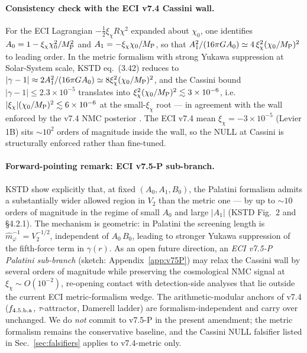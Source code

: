 \paragraph{Consistency check with the ECI v7.4 Cassini wall.}
For the ECI Lagrangian $-\tfrac{1}{2}\xi_\chi R\chi^2$ expanded
about $\chi_0$, one identifies $A_0 = 1 - \xi_\chi\chi_0^2/M_{\rm P}^2$
and $A_1 = -\xi_\chi\chi_0/M_{\rm P}$, so that
$A_1^2/(16\pi G A_0) \simeq 4\,\xi_\chi^2(\chi_0/M_{\rm P})^2$
to leading order.  In the metric formalism with strong Yukawa
suppression at Solar-System scale, KSTD eq.~(3.42) reduces to
$|\gamma-1| \approx 2A_1^2/(16\pi G A_0) \simeq 8\xi_\chi^2(\chi_0/M_{\rm P})^2$,
and the Cassini bound $|\gamma-1|\le 2.3\times 10^{-5}$ translates
into $\xi_\chi^2(\chi_0/M_{\rm P})^2 \lesssim 3\times 10^{-6}$, i.e.\
$|\xi_\chi|(\chi_0/M_{\rm P})^2 \lesssim 6\times 10^{-6}$ at the
small-$\xi_\chi$ root --- in agreement with the wall enforced by
the v7.4 NMC posterior \cite[App.~A]{Wolf25}.  The ECI v7.4 mean
$\xi_\chi = -3\times 10^{-5}$ (Levier 1B) sits $\sim 10^{2}$ orders
of magnitude inside the wall, so the NULL at Cassini is structurally
enforced rather than fine-tuned.

\paragraph{Forward-pointing remark: ECI v7.5-P sub-branch.}
KSTD show explicitly that, at fixed $(A_0,A_1,B_0)$, the Palatini
formalism admits a substantially wider allowed region in $V_2$
than the metric one --- by up to $\sim 10$ orders of magnitude in
the regime of small $A_0$ and large $|A_1|$ (KSTD Fig.~2 and
\S 4.2.1).  The mechanism is geometric: in Palatini the screening
length is $\hat m_\varphi^{-1} = V_2^{-1/2}$, independent of
$A_0\,B_0$, leading to stronger Yukawa suppression of the
fifth-force term in $\gamma(r)$.  As an open future direction, an
\emph{ECI v7.5-P Palatini sub-branch} (sketch: Appendix~\ref{app:v75P})
may relax the Cassini wall by several orders of magnitude while
preserving the cosmological NMC signal at $\xi_\chi\sim O(10^{-2})$,
re-opening contact with detection-side analyses
\cite{Wolf25} that lie outside the current ECI metric-formalism
wedge.  The arithmetic-modular anchors of v7.4
($f_{\rm 4.5.b.a}$, $\tau$-attractor, Damerell ladder) are
formalism-independent and carry over unchanged.  We do
\emph{not} commit to v7.5-P in the present amendment;
the metric formalism remains the conservative baseline,
and the Cassini NULL falsifier listed in Sec.~\ref{sec:falsifiers}
applies to v7.4-metric only.

